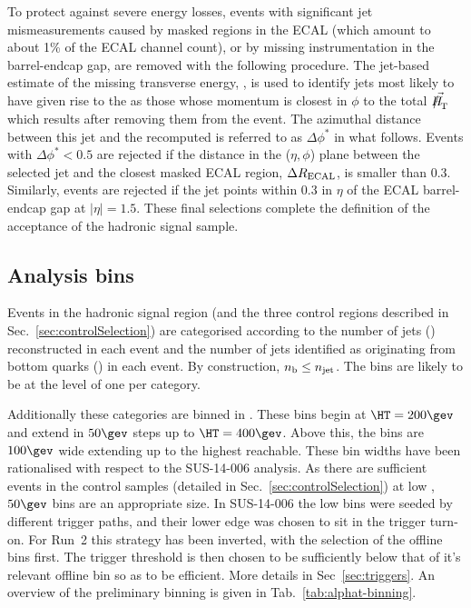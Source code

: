 To protect against severe energy losses, events with significant jet
mismeasurements caused by masked regions in the ECAL (which amount to
about 1\% of the ECAL channel count), or by missing instrumentation in
the barrel-endcap gap, are removed with the following procedure. The
jet-based estimate of the missing transverse energy, \mht, is used to
identify jets most likely to have given rise to the \mht as those
whose momentum is closest in $\phi$ to the total $\vec{\mht}$ which
results after removing them from the event.  The azimuthal distance
between this jet and the recomputed \mht is referred to as
$\Delta\phi^*$ in what follows. Events with $\Delta\phi^* < 0.5$ are
rejected if the distance in the ($\eta,\phi$) plane between the
selected jet and the closest masked ECAL region, $\Delta R_{\rm
  ECAL}$, is smaller than 0.3. Similarly, events are rejected if the
jet points within 0.3 in $\eta$ of the ECAL barrel-endcap gap at
$|\eta| = 1.5$. These final selections complete the definition of the
acceptance of the hadronic signal sample.

\subsection{Analysis bins}

Events in the hadronic signal region (and the
three control regions described in Sec.~\ref{sec:controlSelection}) are
categorised according to the number of jets (\njet) reconstructed in
each event and the number of jets identified as originating from
bottom quarks (\nb) in each event. By construction, $n_{\text{b}} \leq n_{\text{jet}}$. The \njet
bins are likely to be at the level of one \njet per category.

Additionally these categories are binned in \HT. These bins begin at
$\HT=200\gev$ and extend in $50\gev$ steps up to $\HT=400\gev$. Above this, the
bins are $100\gev$ wide extending up to the highest \HT reachable. 
These bin widths have been rationalised with respect to the SUS-14-006 analysis. 
As there are sufficient events in the control
samples (detailed in Sec.~\ref{sec:controlSelection}) at low \HT, $50\gev$ bins
are an appropriate size. In SUS-14-006 the low \HT bins were seeded by different
trigger paths, and their lower edge was chosen to sit in the trigger turn-on. For
Run~2 this strategy has been inverted, with the selection of the offline \HT
bins first. The trigger threshold is then chosen to be sufficiently below that
of it's relevant offline bin so as to be efficient. More details in
Sec~\ref{sec:triggers}. An overview of the preliminary binning is given in Tab.~\ref{tab:alphat-binning}.

